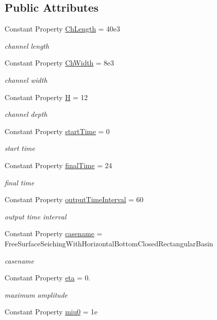 \subsection*{Public Attributes}
\begin{DoxyCompactItemize}
\item 
Constant Property \hyperlink{class_close_channel3d_af505aaf5eda97ab3532f97b1e869d8fc}{Ch\+Length} = 40e3
\begin{DoxyCompactList}\small\item\em channel length \end{DoxyCompactList}\item 
Constant Property \hyperlink{class_close_channel3d_a5124ed070a0e6543848ac61ccf9f1cc4}{Ch\+Width} = 8e3
\begin{DoxyCompactList}\small\item\em channel width \end{DoxyCompactList}\item 
Constant Property \hyperlink{class_close_channel3d_af8f827a2ca3168630761f268962bd562}{H} = 12
\begin{DoxyCompactList}\small\item\em channel depth \end{DoxyCompactList}\item 
Constant Property \hyperlink{class_close_channel3d_a780cac3d00d2aa244b7f914269c4a267}{start\+Time} = 0
\begin{DoxyCompactList}\small\item\em start time \end{DoxyCompactList}\item 
Constant Property \hyperlink{class_close_channel3d_aa1635342d447c0a6195d3bd1cf273c7e}{final\+Time} = 24
\begin{DoxyCompactList}\small\item\em final time \end{DoxyCompactList}\item 
Constant Property \hyperlink{class_close_channel3d_abd6df4b3dc507042d9fa3afde82c142f}{output\+Time\+Interval} = 60
\begin{DoxyCompactList}\small\item\em output time interval \end{DoxyCompactList}\item 
Constant Property \hyperlink{class_close_channel3d_a1c6cb1fcb8b13405334aab2e4dea725b}{casename} = \textquotesingle{}Free\+Surface\+Seiching\+With\+Horizontal\+Bottom\+Closed\+Rectangular\+Basin\textquotesingle{}
\begin{DoxyCompactList}\small\item\em casename \end{DoxyCompactList}\item 
Constant Property \hyperlink{class_close_channel3d_a8b9d0e617bf199b99c5e24e3cdeeee89}{eta} = 0.
\begin{DoxyCompactList}\small\item\em maximum amplitude \end{DoxyCompactList}\item 
Constant Property \hyperlink{class_close_channel3d_a5f639fe4cdab6cadf62ca6f09b62ae61}{miu0} = 1e
\end{DoxyCompactItemize}
